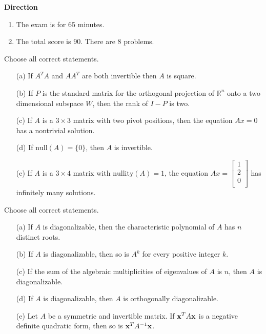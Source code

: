 \documentclass[a4paper,10pt]{article}
\makeatletter
\newlength{\Problen}
\newlength{\Probheadlen}
\newlength{\Probskip}
\newenvironment{ProbK}{\begin{lrbox}{\@syntest}%
    \begin{minipage}\textwidth}{\end{minipage}\end{lrbox}}
\newenvironment{ProbK}[2][]{ %
    \global\setbox\@lastproblem=\vbox\bgroup
    \par\noindent\parbox[t]{\Probheadlen}{\raggedleft\fontsize{10}{10pt}\selectfont
    {\bfseries\large #2 }\\[-1.5mm]
    \rule[1mm]{16mm}{.2mm}\\[-2mm]{\sffamily #1}}\hspace{\Probskip}%
    \begin{minipage}[t]{\Problen}}{\end{minipage}\par\vspace{3mm}\egroup%
    \unvcopy\@lastproblem}
\theoremstyle{remark}
\makeatother
\begin{document}


\begin{center}\textbf{Direction}\end{center}

\begin{enumerate}
\item The exam is for 65 minutes.
\item The total score is 90. There are 8 problems.
\end{enumerate}

\vfill \eject





\begin{ProbK}[pt 10]{1}
Choose all correct statements.

\begin{enumerate}
    \item[(a)] If $A^TA$ and $AA^T$ are both invertible then $A$ is square.
    \item[(b)] If $P$ is the standard matrix for the orthogonal projection of $\mathbb{R}^n$ onto a two dimensional subspace $W$, then the rank of $I-P$ is two.
    \item[(c)] If $A$ is a $3\times 3$ matrix with two pivot positions, then the equation $Ax=0$ has a nontrivial solution.
    \item[(d)] If $\mathrm{null}(A)=\{0\}$, then $A$ is invertible.
    \item[(e)] If $A$ is a $3\times 4$ matrix with $\mathrm{nullity}(A)=1$, the equation $Ax= \begin{bmatrix}
		1 \\
		2 \\
		0 \\
	\end{bmatrix}$ has infinitely many solutions.
\end{enumerate}
\end{ProbK}

\vskip 2cm 

\begin{ProbK}[pt 10]{2}
Choose all correct statements.

\begin{enumerate}
    \item[(a)] If $A$ is diagonalizable, then the characteristic polynomial of $A$ has $n$ distinct roots.
    \item[(b)] If $A$ is diagonalizable, then so is $A^k$ for every positive integer $k$.   
    \item[(c)] If the sum of the algebraic multiplicities of eigenvalues of $A$ is $n$, then $A$ is diagonalizable.
    \item[(d)] If $A$ is diagonalizable, then $A$ is orthogonally diagonalizable. 
    \item[(e)] Let $A$ be a symmetric and invertible matrix. If ${\bf x}^TA{\bf x}$ is a negative definite quadratic form, then so is ${\bf x}^TA^{-1}{\bf x}$. 
\end{enumerate}
\end{ProbK}
\end{document}
